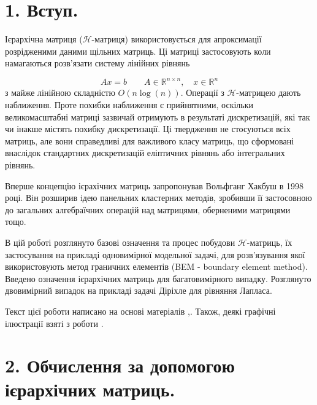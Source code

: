 \documentclass[12pt]{report}
\begin{document}
\chapter{1. Вступ.}
	\hspace{0.8cm} Ієрархічна матриця ($\mathcal{H}$-матриця) використовується для апроксимації розрідженими даними щільних матриць. Ці матриці застосовують коли намагаються розв'язати систему лінійних рівнянь
	
	 $$ Ax=b \quad\quad  A \in \mathbb{R}^{n\times n} ,\quad   x\in \mathbb{R}^n$$ \newline
	 з майже лінійною складністю $O(n\log(n))$. Операції з $\mathcal{H}$-матрицею дають наближення. Проте похибки наближення є прийнятними, оскільки великомасштабні матриці зазвичай отримують в результаті дискретизацій, які так чи інакше містять похибку дискретизації. Ці твердження не стосуються всіх матриць, але вони справедливі для важливого класу матриць, що сформовані внаслідок стандартних дискретизацій еліптичних рівнянь або інтегральних рівнянь. 
	 \par Вперше концепцію ієрахічних матриць запропонував Вольфганг Хакбуш  в 1998 році. Вiн розширив iдею панельних кластерних методів, зробивши її застосовною до загальних алгебраїчних операцій над матрицями, оберненими матрицями тощо. 
	 \par В цій роботі розглянуто базові означення та процес побудови $\mathcal{H}$-матриць, їх застосування на прикладі одновимірної модельної задачі, для розв'язування якої використовують метод граничних елементів (BEM - boundary element method). Введено означення ієрархічних матриць для  багатовимірного випадку. Розглянуто двовимірний випадок на прикладі задачі Діріхле для рівняння Лапласа.
	 \par Текст цієї роботи написано на основі матеріалів \cite{HM},\cite{Diss}. Також, деякі графічні ілюстрації взяті з роботи \cite{HM}.
	 
	
\newpage
\chapter{2. Обчислення за допомогою ієрархічних матриць.}
\end{document}
